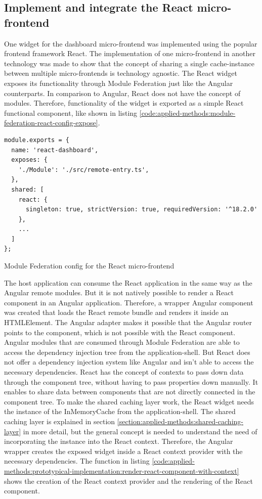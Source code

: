\subsection{Implement and integrate the React micro-frontend}

One widget for the dashboard micro-frontend was implemented using the popular frontend framework React. The implementation of one micro-frontend in another technology was made to show that the concept of sharing a single cache-instance between multiple micro-frontends is technology agnostic. The React widget exposes its functionality through Module Federation just like the Angular counterparts. In comparison to Angular, React does not have the concept of modules. Therefore, functionality of the widget is exported as a simple React functional component, like shown in listing \ref{code:applied-methods:module-federation-react-config-expose}.

\ifshowListings
\begin{listing}[H]
    \begin{verbatim}
module.exports = {
  name: 'react-dashboard',
  exposes: {
    './Module': './src/remote-entry.ts',
  },
  shared: [
    react: {
      singleton: true, strictVersion: true, requiredVersion: '^18.2.0' 
    },
    ...
  ]
};
    \end{verbatim}
    \caption{Module Federation config for the React micro-frontend}\label{code:applied-methods:module-federation-react-config-expose}
\end{listing}
\fi

\noindent The host application can consume the React application in the same way as the Angular remote modules. But it is not natively possible to render a React component in an Angular application. Therefore, a wrapper Angular component was created that loads the React remote bundle and renders it inside an HTMLElement. The Angular adapter makes it possible that the Angular router points to the component, which is not possible with the React component. 
Angular modules that are consumed through Module Federation are able to access the dependency injection tree from the application-shell. But React does not offer a dependency injection system like Angular and isn't able to access the necessary dependencies. React has the concept of contexts to pass down data through the component tree, without having to pass properties down manually. It enables to share data between components that are not directly connected in the component tree. To make the shared caching layer work, the React widget needs the instance of the InMemoryCache from the application-shell. The shared caching layer is explained in section \ref{section:applied-methods:shared-caching-layer} in more detail, but the general concept is needed to understand the need of incorporating the instance into the React context. Therefore, the Angular wrapper creates the exposed widget inside a React context provider with the necessary dependencies. The function in listing \ref{code:applied-methods:prototypical-implementation:render-react-component-with-context} shows the creation of the React context provider and the rendering of the React component. 

